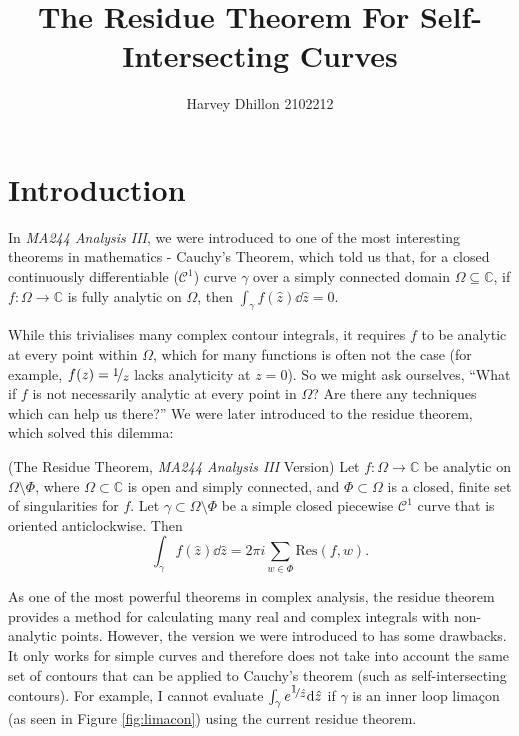 \documentclass[a4paper]{article}
\def\nicefrac#1#2{%
    \raise.5ex\hbox{\begin{footnotesize}$#1$\end{footnotesize}}%
    \kern-.15em/\kern-.035em%
    \lower.25ex\hbox{\begin{footnotesize}$#2$\end{footnotesize}}}
\def\Res{\text{Res}}
\begin{document}
\title{The Residue Theorem For Self-Intersecting Curves}
\author{Harvey Dhillon 2102212}
\maketitle
\thispagestyle{empty}
\clearpage
\tableofcontents
\thispagestyle{empty}
\pagebreak
\setcounter{page}{1}
\section{Introduction}


In \textit{MA244 Analysis III}, we were introduced to one of the most interesting theorems in mathematics - Cauchy's Theorem, which told us that, for a closed continuously differentiable ($\mathcal{C}^1$) curve $\gamma$ over a simply connected domain $\Omega \subseteq \mathbb{C}$, if $f: \Omega \rightarrow \mathbb{C}$ is fully analytic on $\Omega$, then $ \int_\gamma { f(\hat{z}) \dd\hat{z}} = 0$.


While this trivialises many complex contour integrals, it requires $f$ to be analytic at every point within $\Omega$, which for many functions is often not the case (for example, $f(z) = \nicefrac{1}{z}$ lacks analyticity at $z=0$). So we might ask ourselves, ``What if $f$ is not necessarily analytic at every point in $\Omega$? Are there any techniques which can help us there?'' We were later introduced to the residue theorem, which solved this dilemma:

\begin{theorem*}{(The Residue Theorem, \textit{MA244 Analysis III} Version)}{}
Let $f: \Omega \rightarrow \mathbb{C}$ be analytic on $\Omega \setminus \Phi$, where $\Omega \subset \mathbb{C}$  is open and simply connected, and $\Phi \subset \Omega$ is a closed, finite set of singularities for $f$. Let $\gamma \subset \Omega \setminus \Phi$ be a simple closed piecewise $\mathcal{C}^{1}$ curve that is oriented anticlockwise. Then 
\[ \int_\gamma { f(\hat{z}) \dd\hat{z}} = 2 \pi i \sum_{w \in \Phi}  \Res(f,w). \]
\end{theorem*}

As one of the most powerful theorems in complex analysis, the residue theorem provides a method for calculating many real and complex integrals with non-analytic points. However, the version we were introduced to has some drawbacks. It only works for simple curves and therefore does not take into account the same set of contours that can be applied to Cauchy's theorem (such as self-intersecting contours). For example, I cannot evaluate $\int_\gamma { e^{\nicefrac{1}{\hat{z}}} \dd\hat{z}}$ if $\gamma$ is an inner loop limaçon (as seen in Figure \ref{fig:limacon}) using the current residue theorem.
\end{document}

